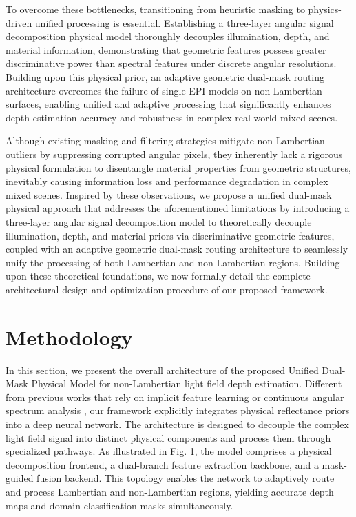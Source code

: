 \documentclass[lettersize,journal]{IEEEtran}
\begin{document}
To overcome these bottlenecks, transitioning from heuristic masking to physics-driven unified processing is essential. Establishing a three-layer angular signal decomposition physical model thoroughly decouples illumination, depth, and material information, demonstrating that geometric features possess greater discriminative power than spectral features under discrete angular resolutions. Building upon this physical prior, an adaptive geometric dual-mask routing architecture overcomes the failure of single EPI models on non-Lambertian surfaces, enabling unified and adaptive processing that significantly enhances depth estimation accuracy and robustness in complex real-world mixed scenes.

Although existing masking and filtering strategies mitigate non-Lambertian outliers by suppressing corrupted angular pixels, they inherently lack a rigorous physical formulation to disentangle material properties from geometric structures, inevitably causing information loss and performance degradation in complex mixed scenes. Inspired by these observations, we propose a unified dual-mask physical approach that addresses the aforementioned limitations by introducing a three-layer angular signal decomposition model to theoretically decouple illumination, depth, and material priors via discriminative geometric features, coupled with an adaptive geometric dual-mask routing architecture to seamlessly unify the processing of both Lambertian and non-Lambertian regions. Building upon these theoretical foundations, we now formally detail the complete architectural design and optimization procedure of our proposed framework.

\section{Methodology}

In this section, we present the overall architecture of the proposed Unified Dual-Mask Physical Model for non-Lambertian light field depth estimation. Different from previous works that rely on implicit feature learning \cite{vaswani2017} or continuous angular spectrum analysis \cite{vaswani2017}, our framework explicitly integrates physical reflectance priors into a deep neural network. The architecture is designed to decouple the complex light field signal into distinct physical components and process them through specialized pathways. As illustrated in Fig. 1, the model comprises a physical decomposition frontend, a dual-branch feature extraction backbone, and a mask-guided fusion backend. This topology enables the network to adaptively route and process Lambertian and non-Lambertian regions, yielding accurate depth maps and domain classification masks simultaneously.
\end{document}
